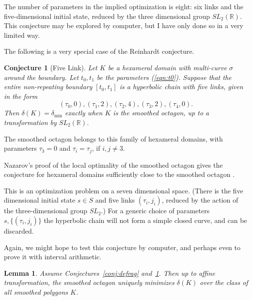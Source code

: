 \documentclass[11pt]{amsart}
\newtheorem{lemma}{Lemma}
\newtheorem{conj}{Conjecture}
\newcommand{\ring}[1]{\mathbb{#1}}
\def\deltalat{\mathbb\delta}  %
\def\delt{\delta_{\min}}
\def\rR{{\ring{R}}}
\def\ta{{\tau}}
\begin{document}
The number of parameters in the implied optimization is eight:
six links and the five-dimensional initial state, reduced by the three dimensional group $SL_2(\rR)$.
This conjecture may be explored by computer, but I have only done
so in a very limited way.

\bigskip

The following is a very special case of the Reinhardt conjecture.

\begin{conj}[Five Link]\label{conj:5} 
Let $K$ be a hexameral domain with multi-curve $\sigma$ around the
boundary. 
Let $t_0,t_1$ be the parameters (\ref{eqn:t0}).  Suppose
that the entire non-repeating boundary $[t_0,t_1]$ is a hyperbolic chain with five
links, given in the form 
$$
(\ta_0,0),(\ta_1,2),(\ta_2,4),(\ta_3,2),(\ta_4,0).
$$
Then $\deltalat(K)= \delt$ exactly when
$K$ is the smoothed octagon, up to 
a transformation by $SL_2(\rR)$.
\end{conj}

The smoothed octagon belongs to this family of hexameral
domains, with parameters $\ta_3=0$ and $\ta_i=\ta_j$, if $i,j\ne 3$.

Nazarov's proof of the local optimality of the smoothed octagon
gives the conjecture for hexameral domains sufficiently close
to the smoothed octagon \cite{N}.

This is an optimization problem on a seven dimensional space.
(There is the five dimensional initial state $s\in S$ and
five links $(\ta_i,j_i)$, reduced by the action of the three-dimensional
group $SL_2$.)  For a generic choice of parameters $s,\{(\ta_i,j_i)\}$
the hyperbolic chain will not form a simple closed curve, and can
be discarded.  

Again, we might hope to test this conjecture by computer, and perhaps
even to prove it with interval arithmetic.

\begin{lemma}\label{lemma:smooth}  Assume Conjectures~\ref{conj:defrag} and~\ref{conj:5}.
Then up to affine transformation, the smoothed octagon uniquely
minimizes $\deltalat(K)$ over the class of all smoothed polygons $K$.
\end{lemma}
\end{document}
